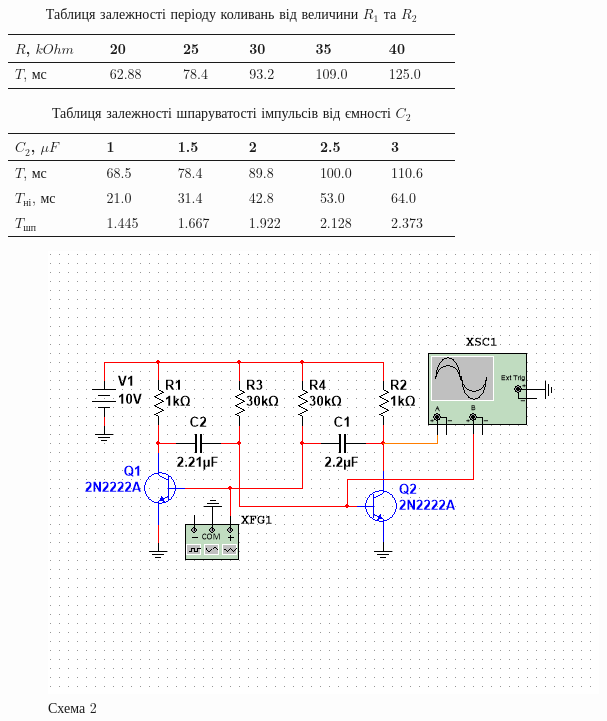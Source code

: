 \documentclass{article}
\begin{document}
\begin{normalsize}
	\begin{table}[H]
		\centering
		\renewcommand*\arraystretch{1.3}
		\begin{tabular}{|p{0.12\linewidth}|p{0.08\linewidth}|p{0.08\linewidth}|p{0.08\linewidth}|p{0.08\linewidth}|p{0.08\linewidth}|}
			\hline
			$R$, $kOhm$&20&25&30&35&40\\
			\hline
			$T$, мс&62.88&78.4&93.2&109.0&125.0\\
			\hline
		\end{tabular}
		\caption{Таблиця залежності періоду коливань від величини $R_1$ та $R_2$}
	\end{table}
	
	\begin{table}[H]
		\centering
		\renewcommand*\arraystretch{1.3}
		\begin{tabular}{|p{0.12\linewidth}|p{0.08\linewidth}|p{0.08\linewidth}|p{0.08\linewidth}|p{0.08\linewidth}|p{0.08\linewidth}|}
			\hline
			$C_2$, $\mu F$&1&1.5&2&2.5&3\\
			\hline
			$T$, мс&68.5&78.4&89.8&100.0&110.6\\
			\hline
			$T_{\text{ні}}$, мс&21.0&31.4&42.8&53.0&64.0\\
			\hline
			$T_{\text{шп}}$&1.445&1.667&1.922&2.128&2.373\\
			\hline
		\end{tabular}
		\caption{Таблиця залежності шпаруватості імпульсів від ємності $C_2$}
	\end{table}
	
	\begin{figure}[H]
		\centering
		\includegraphics[width=\textwidth]{3}
		\caption{Схема 2}
	\end{figure}
	

\end{normalsize}
\end{document}
